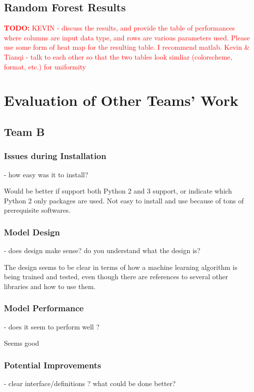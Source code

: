 \documentclass[paper=a4, fontsize=11pt]{scrartcl}
\numberwithin{equation}{section}    %
\numberwithin{figure}{section}      %
\numberwithin{table}{section}       %
\newcommand{\TODO}[1]{\textcolor{red}{\textbf{TODO: } #1}}
\numberwithin{equation}{section}    %
\numberwithin{figure}{section}      %
\numberwithin{table}{section}       %
\begin{document}
\subsection{Random Forest Results}

\TODO{KEVIN - discuss the results, and provide the table of performances where columns are input data type, and rows are various parameters used. Please use some form of heat map for the resulting table. I recommend matlab. Kevin \& Tianqi - talk to each other so that the two tables look simliar (colorscheme, format, etc.) for uniformity}


\section{Evaluation of Other Teams' Work}

\subsection{Team B}

\subsubsection{Issues during Installation}
- how easy was it to install?

Would be better if support both Python 2 and 3 support, or indicate which Python 2 only packages are used.
Not easy to install and use because of tons of prerequisite softwares.

\subsubsection{Model Design}
- does design make sense? do you understand what the design is?

The design seems to be clear in terms of how a machine learning algorithm is being trained and tested, even though there are references to several other libraries and how to use them.


\subsubsection{Model Performance}
- does it seem to perform well ?

Seems good

\subsubsection{Potential Improvements}
- clear interface/definitions ? what could be done better?
\end{document}
